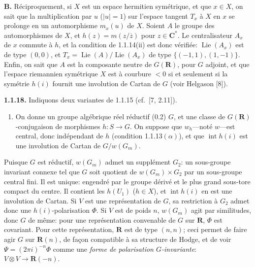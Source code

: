 \documentclass[10pt,a4paper]{article}
\providecommand{\tightlist}{\setlength{\itemsep}{0pt}\setlength{\parskip}{0pt}}
\begin{document}
\textbf{B.} Réciproquement, si \(X\) est un espace hermitien symétrique, et que \(x\in X\), on sait que la multiplication par \(u\) (\(|u|=1\)) sur l'espace tangent \(T_x\) à \(X\) en \(x\) se prolonge en un automorphisme \(m_x(u)\) de \(X\). Soient \(A\) le groupe des automorphismes de \(X\), et \(h(z)=m(z/\overline z)\) pour \(z\in\mathbf C^*\). Le centralisateur \(A_x\) de \(x\) commute à \(h\), et la condition de 1.1.14(ii) est donc vérifiée: \(\operatorname{Lie}(A_x)\) est de type \((0,0)\), et \(T_x=\operatorname{Lie}(A)/\operatorname{Lie}(A_x)\) de type \(\{(-1,1),(1,-1)\}\). Enfin, on sait que \(A\) est la composante neutre de \(G(\mathbf R)\), pour \(G\) adjoint, et que l'espace riemannien symétrique \(X\) est à courbure \(<0\) si et seulement si la symétrie \(h(i)\) fournit une involution de Cartan de \(G\) (voir Helgason {[}8{]}).

\textbf{1.1.18.} Indiquons deux variantes de 1.1.15 (cf.~{[}7, 2.11{]}).

\begin{enumerate}
\def\labelenumi{(\alph{enumi})}
\tightlist
\item
  On donne un groupe algébrique réel réductif (0.2) \(G\), et une classe de \(G(\mathbf R)\)-conjugaison de morphismes \(h:S\to G\). On suppose que \(w_h\)---noté \(w\)---est central, donc indépendant de \(h\) (condition 1.1.13\((\alpha)\)), et que \(\operatorname{int}h(i)\) est une involution de Cartan de \(G/w(G_m)\).
\end{enumerate}

Puisque \(G\) est réductif, \(w(G_m)\) admet un supplément \(G_2\): un sous-groupe invariant connexe tel que \(G\) soit quotient de \(w(G_m)\times G_2\) par un sous-groupe central fini. Il est unique: engendré par le groupe dérivé et le plus grand sous-tore compact du centre. Il contient les \(h(U_1)\) (\(h\in X\)), et \(\operatorname{int}h(i)\) en est une involution de Cartan. Si \(V\) est une représentation de \(G\), sa restriction à \(G_2\) admet donc une \(h(i)\)-polarisation \(\Phi\). Si \(V\) est de poids \(n\), \(w(G_m)\) agit par similitudes, donc \(G\) de même: pour une représentation convenable de \(G\) sur \(\mathbf R\), \(\Phi\) est covariant. Pour cette représentation, \(\mathbf R\) est de type \((n,n)\); ceci permet de faire agir \(G\) sur \(\mathbf R(n)\), de façon compatible à sa structure de Hodge, et de voir \(\Psi=(2\pi i)^{-n}\Phi\) comme une \emph{forme de polarisation \(G\)-invariante}: \(V\otimes V\to\mathbf R(-n)\).
\end{document}
